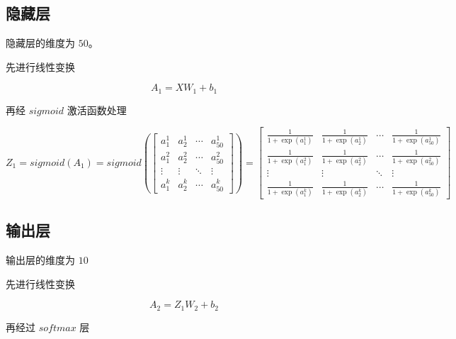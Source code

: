 \documentclass[12pt,a4paper]{amsart}
\begin{document}
\subsection{隐藏层}

隐藏层的维度为 $50$。

先进行线性变换

\begin{equation} \label{eq:3}
	A_1 = X W_1 + b_1
\end{equation}

再经 $sigmoid$ 激活函数处理

\begin{equation} \label{eq:4}
	Z_1 = sigmoid(A_1) = sigmoid(\begin{bmatrix}
		a_1^1  & a_2^1  & \cdots & a_{50}^1 \\
		a_1^2  & a_2^2  & \cdots & a_{50}^2 \\
		\vdots & \vdots & \ddots & \vdots    \\
		a_1^k  & a_2^k  & \cdots & a_{50}^k
		\end{bmatrix}) = \begin{bmatrix}
			\frac{1}{1 + \exp(a_1^1)} & \frac{1}{1 + \exp(a_2^1)} & \cdots & \frac{1}{1 + \exp(a_{50}^1)} \\
			\frac{1}{1 + \exp(a_1^2)} & \frac{1}{1 + \exp(a_2^2)} & \cdots & \frac{1}{1 + \exp(a_{50}^2)} \\
			\vdots                      & \vdots                      & \ddots & \vdots                      \\
			\frac{1}{1 + \exp(a_1^k)} & \frac{1}{1 + \exp(a_2^k)} & \cdots & \frac{1}{1 + \exp(a_{50}^k)}
		\end{bmatrix}
\end{equation}

\subsection{输出层}

输出层的维度为 $10$

先进行线性变换

\begin{equation} \label{eq:5}
	A_2 = Z_1 W_2 + b_2
\end{equation}

再经过 $softmax$ 层
\end{document}
